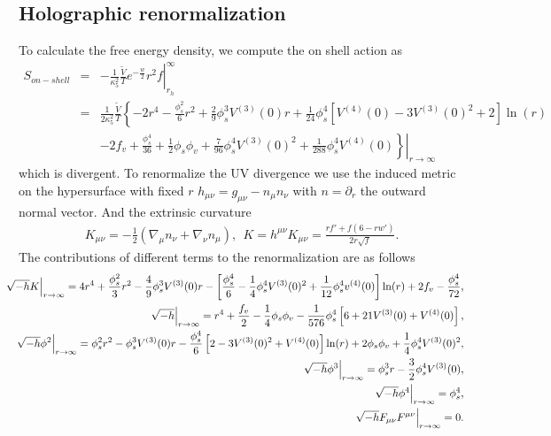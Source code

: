 \documentclass[a4paper,12pt]{article}
\numberwithin{equation}{section}
\begin{document}
\subsection{Holographic renormalization}
To calculate the free energy density, we compute the on shell action as
\begin{eqnarray}
     S_{on-shell}&=&\left. -\frac{1}{\kappa_5^2}\frac{\tilde{V}}{T} e^{-\frac{w}{2}}r^2f\right|_{r_h}^{\infty} \nonumber  \\
    &=& \frac{1}{2\kappa_5^2}\frac{\tilde{V}}{T}\left\{-2r^4-\frac{\phi_s^2}{6}r^2+\frac{2}{9}\phi_s^3 V^{(3)}(0)r+\frac{1}{24}\phi_s^4\left[V^{(4)}(0)-3V^{(3)}(0)^2+2\right]\ln(r) \right.\nonumber \\
    &&\left.\left. -2f_v+\frac{\phi_s^4}{36}+\frac{1}{2}\phi_s\phi_v+\frac{7}{96}\phi_s^4V^{(3)}(0)^2+\frac{1}{288}\phi_s^4V^{(4)}(0)\right\}\right|_{r\rightarrow \infty}
\end{eqnarray}
which is divergent. To renormalize the UV divergence we use the induced metric on the hypersurface with fixed $r$ $h_{\mu\nu}=g_{\mu\nu}-n_{\mu}n_{\nu}$ with $n=\partial_r$ the outward normal vector. And the extrinsic curvature
\begin{eqnarray}
    K_{\mu\nu}=-\frac{1}{2}\left(\nabla_\mu n_\nu+\nabla_\nu n_\mu \right),~~K=h^{\mu\nu}K_{\mu\nu}=\frac{rf'+f\left(6-rw'\right)}{2r\sqrt{f}}.
\end{eqnarray}
The contributions of different terms to the renormalization are as follows
\begin{eqnarray}
   && \hspace{-0.8cm} \left. \sqrt{-h}K\right|_{r\rightarrow\infty}=4r^4+\frac{\phi_s^2}{3}r^2-\frac{4}{9}\phi_s^3 V^{(3)}(0)r-\left[\frac{\phi_s^4}{6}-\frac{1}{4}\phi_s^4V^{(3)}(0)^2 +\frac{1}{12}\phi_s^4v^{(4)}(0)\right]\ln(r)+2f_v-\frac{\phi_s^4}{72}, \nonumber \\
   && \hspace{-0.4cm}\left. \sqrt{-h}\right|_{r\rightarrow\infty}= r^4+\frac{f_v}{2}-\frac{1}{4}\phi_s\phi_v-\frac{1}{576}\phi_s^4\left[6+21 V^{(3)}(0)+V^{(4)}(0)\right], \nonumber \\
   && \hspace{-0.8cm}\left. \sqrt{-h}\phi^2\right|_{r\rightarrow\infty}= \phi_s^2r^2-\phi_s^3V^{(3)}(0)r-\frac{\phi_s^4}{6}\left[2-3V^{(3)}(0)^2 +V^{(4)}(0)\right]\ln(r)  +2\phi_s\phi_v+\frac{1}{4}\phi_s^4V^{(3)}(0)^2 ,\nonumber \\
   && \hspace{-0.8cm}\left. \sqrt{-h}\phi^3\right|_{r\rightarrow\infty}= \phi_s^3 r -\frac{3}{2}\phi_s^4V^{(3)}(0), \nonumber \\
   && \hspace{-0.8cm} \left. \sqrt{-h}\phi^4\right|_{r\rightarrow\infty}= \phi_s^4 ,\nonumber \\
  && \hspace{-0.8cm} \left. \sqrt{-h}F_{\mu\nu}F^{\mu\nu}\right|_{r\rightarrow\infty}= 0.
\end{eqnarray}
\end{document}

